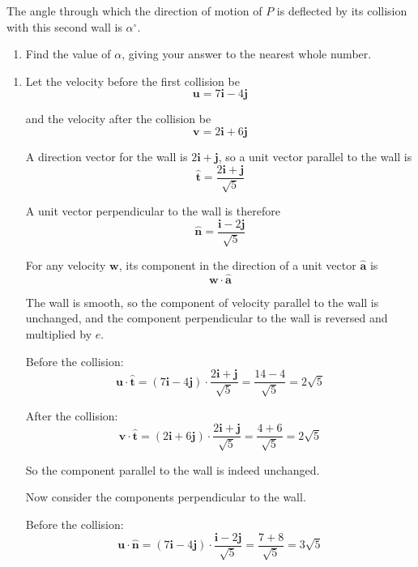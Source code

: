 \documentclass[leqno]{article}
\begin{document}
\begin{enumerate}[
  label=\textbf{\arabic*.},
  leftmargin=*,
  topsep=0pt,
  partopsep=0pt,
  parsep=0pt
]
The angle through which the direction of motion of $P$ is deflected by its collision with this second wall is $\alpha^\circ$. \\

\begin{enumerate}[label=\textbf{(\alph*)}, resume]
  \item Find the value of $\alpha$, giving your answer to the nearest whole number.  \\
\end{enumerate}

\vspace*{10pt}

\begin{djsSolution}
\begin{enumerate}[label=\textbf{(\alph*)}]
  \item Let the velocity before the first collision be
\[
\mathbf{u}=7\mathbf{i}-4\mathbf{j}
\]

and the velocity after the collision be
\[
\mathbf{v}=2\mathbf{i}+6\mathbf{j}
\]

A direction vector for the wall is \(2\mathbf{i}+\mathbf{j}\), so a unit vector parallel to the wall is
\[
\hat{\mathbf{t}}=\frac{2\mathbf{i}+\mathbf{j}}{\sqrt{5}}
\]

A unit vector perpendicular to the wall is therefore
\[
\hat{\mathbf{n}}=\frac{\mathbf{i}-2\mathbf{j}}{\sqrt{5}}
\]

For any velocity \(\mathbf{w}\), its component in the direction of a unit vector \(\hat{\mathbf{a}}\) is
\[
\mathbf{w}\cdot \hat{\mathbf{a}}
\]

The wall is smooth, so the component of velocity parallel to the wall is unchanged, and the component perpendicular to the wall is reversed and multiplied by \(e\).

Before the collision:
\[
\mathbf{u}\cdot \hat{\mathbf{t}}
=(7\mathbf{i}-4\mathbf{j})\cdot \frac{2\mathbf{i}+\mathbf{j}}{\sqrt{5}}
=\frac{14-4}{\sqrt{5}}
=2\sqrt{5}
\]

After the collision:
\[
\mathbf{v}\cdot \hat{\mathbf{t}}
=(2\mathbf{i}+6\mathbf{j})\cdot \frac{2\mathbf{i}+\mathbf{j}}{\sqrt{5}}
=\frac{4+6}{\sqrt{5}}
=2\sqrt{5}
\]

So the component parallel to the wall is indeed unchanged.

Now consider the components perpendicular to the wall.

Before the collision:
\[
\mathbf{u}\cdot \hat{\mathbf{n}}
=(7\mathbf{i}-4\mathbf{j})\cdot \frac{\mathbf{i}-2\mathbf{j}}{\sqrt{5}}
=\frac{7+8}{\sqrt{5}}
=3\sqrt{5}
\]


\end{enumerate}
\end{djsSolution}
\end{enumerate}
\end{document}
